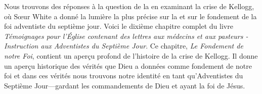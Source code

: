 Nous trouvons des réponses à la question de la  en examinant la crise de Kellogg, où Sœur White a donné la lumière la plus précise sur la  et sur le fondement de la foi adventiste du septième jour. Voici le dixième chapitre complet du livre \textit{Témoignages pour l'Église contenant des lettres aux médecins et aux pasteurs - Instruction aux Adventistes du Septième Jour}. Ce chapitre, \textit{Le Fondement de notre Foi}, contient un aperçu profond de l'histoire de la crise de Kellogg. Il donne un aperçu historique des vérités que Dieu a données comme fondement de notre foi et dans ces vérités nous trouvons notre identité en tant qu'Adventistes du Septième Jour—gardant les commandements de Dieu et ayant la foi de Jésus.
